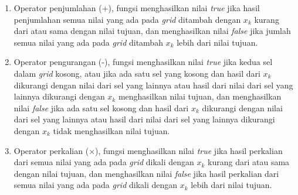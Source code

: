 \documentclass[a4paper,twoside]{article}
\begin{document}
\begin{enumerate}
\begin{enumerate}
\item Operator penjumlahan (+), fungsi menghasilkan nilai \textit{true} jika hasil penjumlahan semua nilai yang ada pada \textit{grid} ditambah dengan \begin{math}x_k\end{math} kurang dari atau sama dengan nilai tujuan, dan menghasilkan nilai \textit{false} jika jumlah semua nilai yang ada pada \textit{grid} ditambah \begin{math}x_k\end{math} lebih dari nilai tujuan.
\item Operator pengurangan (-), fungsi menghasilkan nilai \textit{true} jika kedua sel dalam \textit{grid} kosong, atau jika ada satu sel yang kosong dan hasil dari \begin{math}x_k\end{math} dikurangi dengan nilai dari sel yang lainnya atau hasil dari nilai dari sel yang lainnya dikurangi dengan \begin{math}x_k\end{math} menghasilkan nilai tujuan, dan menghasilkan nilai \textit{false} jika ada satu sel kosong dan hasil dari \begin{math}x_k\end{math} dikurangi dengan nilai dari sel yang lainnya atau hasil dari nilai dari sel yang lainnya dikurangi dengan \begin{math}x_k\end{math} tidak menghasilkan nilai tujuan.
\item Operator perkalian (\begin{math}\times\end{math}), fungsi menghasilkan nilai \textit{true} jika hasil perkalian dari semua nilai yang ada pada \textit{grid} dikali dengan \begin{math}x_k\end{math} kurang dari atau sama dengan nilai tujuan, dan menghasilkan nilai \textit{false} jika hasil perkalian dari semua nilai yang ada pada \textit{grid} dikali dengan \begin{math}x_k\end{math} lebih dari nilai tujuan.

\end{enumerate}
\end{enumerate}
\end{document}
